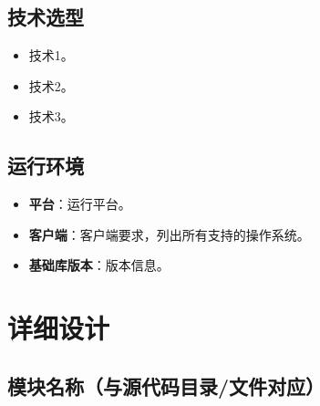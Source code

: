 \documentclass[a4paper,12pt]{article}
\begin{document}
\subsection{技术选型}

\begin{itemize}[leftmargin=2em]
  \item {{技术1}}。
  \item {{技术2}}。
  \item {{技术3}}。
\end{itemize}

\subsection{运行环境}

\begin{itemize}[leftmargin=2em]
  \item \textbf{平台}：{{运行平台}}。
  \item \textbf{客户端}：{{客户端要求，列出所有支持的操作系统}}。
  \item \textbf{基础库版本}：{{版本信息}}。
\end{itemize}


\section{详细设计}



\subsection{{{模块名称（与源代码目录/文件对应）}}}
\end{document}
